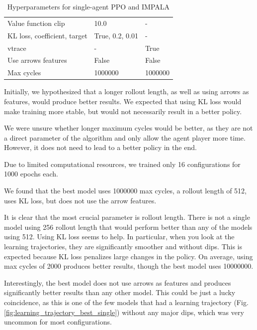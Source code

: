 \documentclass[12pt,a4paper, onecolumn]{exam}
\begin{document}
\begin{table}[h]
\begin{tabular}{|l|l|l|}
        Value function clip          & 10.0                          & -                        \\
        KL loss, coefficient, target & True, 0.2, 0.01               & -                        \\
        \hline
        vtrace                       & -                             & True                     \\
        \hline
        Use arrows features          & False                         & False                    \\
        Max cycles                   & 1000000                       & 1000000                  \\
        \hline
    \end{tabular}
    \caption{Hyperparameters for single-agent PPO and IMPALA}
    \label{tab:hyperparameters}
\end{table}


Initially, we hypothesized that a longer rollout length, as well as using arrows as features, would produce better results.
We expected that using KL loss would make training more stable, but would not necessarily result in a better policy.

We were unsure whether longer maximum cycles would be better, as they are not a direct parameter of the algorithm and only allow the agent player more time.
However, it does not need to lead to a better policy in the end.

Due to limited computational resources, we trained only 16 configurations for 1000 epochs each.

We found that the best model uses 1000000 max cycles, a rollout length of 512, uses KL loss, but does not use the arrow features.

It is clear that the most crucial parameter is rollout length.
There is not a single model using 256 rollout length that would perform better than any of the models using 512.
Using KL loss seems to help. In particular, when you look at the learning trajectories,
they are significantly smoother and without dips. This is expected because KL loss penalizes large changes in the policy.
On average, using max cycles of 2000 produces better results, though the best model uses 10000000.

Interestingly, the best model does not use arrows as features and produces significantly better
results than any other model. This could be just a lucky coincidence, as this is one of the few
models that had a learning trajectory (Fig. \ref{fig:learning_trajectory_best_single}) without any major dips, which was very uncommon for most configurations.
\end{document}
